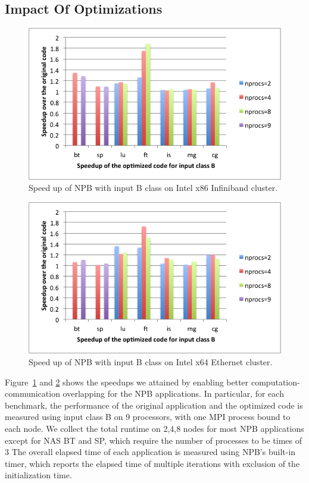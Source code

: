 \subsection{Impact Of Optimizations}
\begin{figure}
{\scriptsize
\centering
\includegraphics[width=.48\textwidth]{fig/blues/npb_blues_B.png}
\caption{Speed up of NPB with input B class on Intel x86 Infiniband cluster.}
\label{fig:npb:x86}
}%
\end{figure}
\begin{figure}
{\scriptsize
\centering
\includegraphics[width=.48\textwidth]{fig/disco/npb_disco_B.png}
\caption{Speed up of NPB with input B class on Intel x64 Ethernet cluster.}
\label{fig:npb:x64}
}%
\end{figure}


Figure~\ref{fig:npb:x86} and \ref{fig:npb:x64}
shows the speedups we attained by enabling better computation-communication overlapping for the NPB applications.
In particular, for each benchmark, the performance of the original application and the optimized code is measured using input class B on 9 processors,  with one MPI process bound to each node.
We collect the total runtime on 2,4,8 nodes for most NPB applications except  for NAS BT and SP, which require the number of processes to be times of 3
The overall elapsed time of each application is measured using NPB's built-in timer, which reports the elapsed time of multiple iterations with exclusion of the initialization time.


